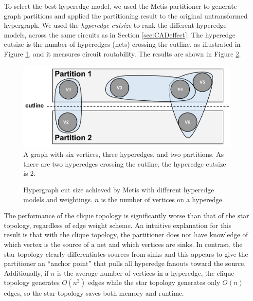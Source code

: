 To select the best hyperedge model, we used the Metis partitioner to generate graph partitions and applied the partitioning result to the original untransformed hypergraph. We used the \emph{hyperedge cutsize} to rank the different hyperedge models, across the same circuits as in Section \ref{sec:CADeffect}. The hyperedge cutsize is the number of hyperedges (nets) crossing the cutline, as illustrated in Figure \ref{fig:hyperedge_cutline}, and it measures circuit routability. The results are shown in Figure \ref{fig:graph_topology_cutsize}.

\begin{figure}[!htbp]
\centering
\includegraphics[width=0.75\linewidth]{hyperedge_cutline.pdf}
\caption{A graph with six vertices, three hyperedges, and two partitions. As there are two hyperedges crossing the cutline, the hyperedge cutsize is 2.}
\label{fig:hyperedge_cutline}
\end{figure}

\begin{figure}[!htbp]
\centering
%

\caption{Hypergraph cut size achieved by Metis with different hyperedge models and weightings. $n$ is the number of vertices on a hyperedge.}
\label{fig:graph_topology_cutsize}
\end{figure}

The performance of the clique topology is significantly worse than that of the star topology, regardless of edge weight scheme. An intuitive explanation for this result is that with the clique topology, the partitioner does not have knowledge of which vertex is the source of a net and which vertices are sinks. In contrast, the star topology clearly differentiates sources from sinks and this appears to give the partitioner an “anchor point” that pulls all hyperedge fanouts toward the source. Additionally, if $n$ is the average number of vertices in a hyperedge, the clique topology generates $O(n^2)$ edges while the star topology generates only $O(n)$ edges, so the star topology saves both memory and runtime.

